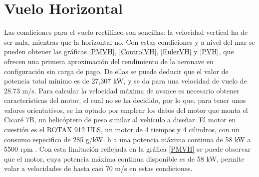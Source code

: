 \thispagestyle{empty}
\chapter{Vuelo Horizontal}


Las condiciones para el vuelo rectilíneo son sencillas: la velocidad vertical ha de ser nula, mientras que la horizontal no. Con estas condiciones y a nivel del mar se pueden obtener las gráficas \ref{PMVH}, \ref{ControlVH}, \ref{EulerVH} y \ref{PVH}, que ofrecen una primera aproximación del rendimiento de la aeronave en configuración sin carga de pago. De ellas se puede deducir que el valor de potencia total mínimo es de 27,307 kW, y se da para una velocidad de vuelo de 28.73 m/s. Para calcular la velocidad máxima de avance es necesario obtener características del motor, el cual no se ha decidido, por lo que, para tener unos valores orientativos, se ha optado por emplear los datos del motor que monta el Cicaré 7B, un helicóptero de peso similar al vehículo a diseñar. El motor en cuestión es el ROTAX 912 ULS, un motor de 4 tiempos y 4 cilindros, con un consumo especifico de 285 g/kW$\cdot$ h a una potencia máxima continua de 58 kW a 5500 rpm \citep{ROTAX}. Con esta limitación reflejada en la gráfica \ref{PMVH} se puede observar que el motor, cuya potencia máxima continua disponible es de 58 kW, permite volar a velocidades de hasta casi 70 m/s en estas condiciones.

